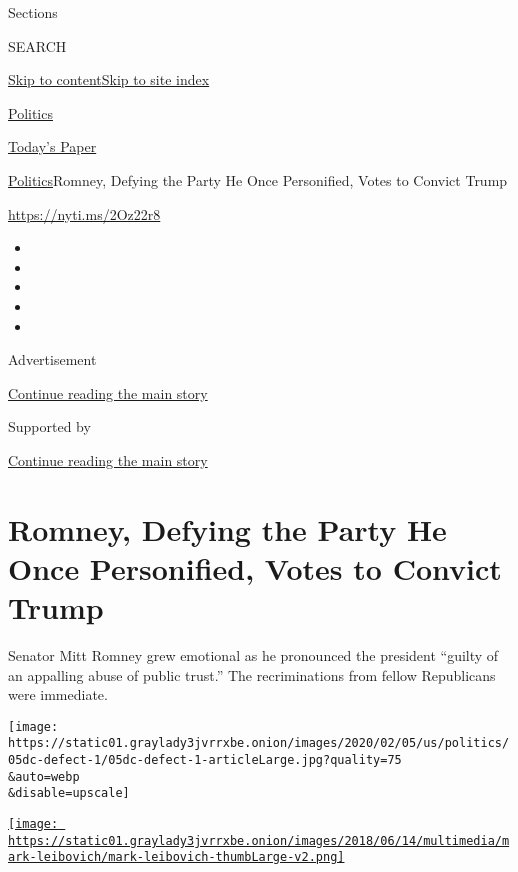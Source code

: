 Sections

SEARCH

\protect\hyperlink{site-content}{Skip to
content}\protect\hyperlink{site-index}{Skip to site index}

\href{https://www.nytimes3xbfgragh.onion/section/politics}{Politics}

\href{https://myaccount.nytimes3xbfgragh.onion/auth/login?response_type=cookie\&client_id=vi}{}

\href{https://www.nytimes3xbfgragh.onion/section/todayspaper}{Today's
Paper}

\href{/section/politics}{Politics}\textbar{}Romney, Defying the Party He
Once Personified, Votes to Convict Trump

\url{https://nyti.ms/2Oz22r8}

\begin{itemize}
\item
\item
\item
\item
\item
\end{itemize}

Advertisement

\protect\hyperlink{after-top}{Continue reading the main story}

Supported by

\protect\hyperlink{after-sponsor}{Continue reading the main story}

\hypertarget{romney-defying-the-party-he-once-personified-votes-to-convict-trump}{%
\section{Romney, Defying the Party He Once Personified, Votes to Convict
Trump}\label{romney-defying-the-party-he-once-personified-votes-to-convict-trump}}

Senator Mitt Romney grew emotional as he pronounced the president
``guilty of an appalling abuse of public trust.'' The recriminations
from fellow Republicans were immediate.

\texttt{[image: https://static01.graylady3jvrrxbe.onion/images/2020/02/05/us/politics/05dc-defect-1/05dc-defect-1-articleLarge.jpg?quality=75\\\&auto=webp\\\&disable=upscale]}

\href{https://www.nytimes3xbfgragh.onion/by/mark-leibovich}{\texttt{[image: https://static01.graylady3jvrrxbe.onion/images/2018/06/14/multimedia/mark-leibovich/mark-leibovich-thumbLarge-v2.png]}}

